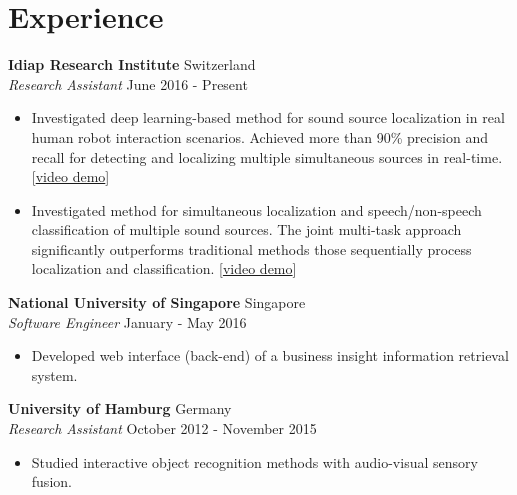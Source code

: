 \documentclass[a4paper,11pt]{article} %
\begin{document}

\section{Experience}

\textbf{Idiap Research Institute}  \hfill Switzerland \\
\textit{Research Assistant} \hfill June 2016 - Present
\vspace{-.9\parskip}
\begin{itemize}
  \item Investigated deep learning-based method for sound source localization in real human robot interaction scenarios. Achieved more than 90\% precision and recall for detecting and localizing multiple simultaneous sources in real-time.
    [\href{https://www.youtube.com/watch?v=_4EwuVlE_pU}{video demo}]
  \item Investigated method for simultaneous localization and speech/non-speech classification of multiple sound sources. The joint multi-task approach significantly outperforms traditional methods those sequentially process localization and classification.
    [\href{https://www.youtube.com/watch?v=O7bQvg03RTc}{video demo}]
\end{itemize}


\textbf{National University of Singapore}  \hfill Singapore \\
\textit{Software Engineer} \hfill January - May 2016
\vspace{-.9\parskip}
\begin{itemize}
  \item Developed web interface (back-end) of a business insight information retrieval system.
\end{itemize}


\textbf{University of Hamburg} \hfill Germany \\
\textit{Research Assistant}  \hfill October 2012 - November 2015
\vspace{-.9\parskip}
\begin{itemize}
  \item Studied interactive object recognition methods with audio-visual sensory fusion.
\end{itemize}
\end{document}
